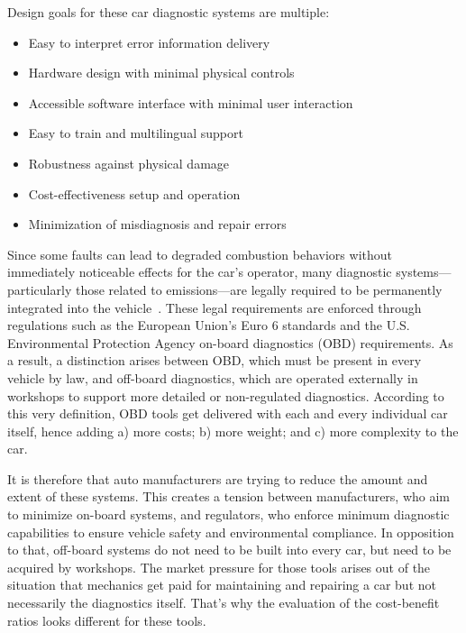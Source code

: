 Design goals for these car diagnostic systems are multiple:
\begin{itemize}
  \item Easy to interpret error information delivery
  \item Hardware design with minimal physical controls
  \item Accessible software interface with minimal user interaction
  \item Easy to train and multilingual support
  \item Robustness against physical damage
  \item Cost-effectiveness setup and operation
  \item Minimization of misdiagnosis and repair errors
\end{itemize}
Since some faults can lead to degraded combustion behaviors without immediately noticeable effects for the car’s operator, 
many diagnostic systems—particularly those related to emissions—are legally required to be permanently integrated into the vehicle~\cite{obdregulations, epaobd}. 
These legal requirements are enforced through regulations such as the European Union’s Euro 6 standards and the U.S. Environmental Protection Agency on-board diagnostics (OBD) requirements. 
As a result, a distinction arises between OBD, which must be present in every vehicle by law, and off-board diagnostics, 
which are operated externally in workshops to support more detailed or non-regulated diagnostics.
According to this very definition, OBD tools get delivered with each and every individual car itself, hence adding a) more costs; b) more weight; and c) more complexity to the car.

It is therefore that auto manufacturers are trying to reduce the amount and extent of these systems. 
This creates a tension between manufacturers, who aim to minimize on-board systems, and regulators, who enforce minimum diagnostic capabilities to ensure vehicle safety and environmental compliance.
In opposition to that, off-board systems do not need to be built into every car, but need to be acquired by workshops. 
The market pressure for those tools arises out of the situation that mechanics get paid for maintaining and repairing a car but not necessarily the diagnostics itself. 
That’s why the evaluation of the cost-benefit ratios looks different for these tools.

